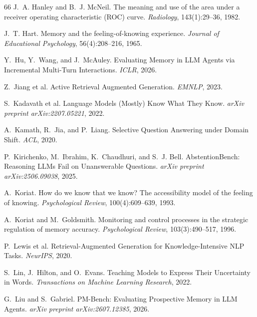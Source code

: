 \documentclass{article}
\begin{document}
\begin{thebibliography}{66}
J.~A. Hanley and B.~J. McNeil. The meaning and use of the area under a receiver operating characteristic (ROC) curve. \emph{Radiology}, 143(1):29--36, 1982.

J.~T. Hart. Memory and the feeling-of-knowing experience. \emph{Journal of Educational Psychology}, 56(4):208--216, 1965.

Y.~Hu, Y.~Wang, and J.~McAuley. Evaluating Memory in LLM Agents via Incremental Multi-Turn Interactions. \emph{ICLR}, 2026.

Z.~Jiang et al. Active Retrieval Augmented Generation. \emph{EMNLP}, 2023.

S.~Kadavath et al. Language Models (Mostly) Know What They Know. \emph{arXiv preprint arXiv:2207.05221}, 2022.

A.~Kamath, R.~Jia, and P.~Liang. Selective Question Answering under Domain Shift. \emph{ACL}, 2020.

P.~Kirichenko, M.~Ibrahim, K.~Chaudhuri, and S.~J. Bell. AbstentionBench: Reasoning LLMs Fail on Unanswerable Questions. \emph{arXiv preprint arXiv:2506.09038}, 2025.

A.~Koriat. How do we know that we know? The accessibility model of the feeling of knowing. \emph{Psychological Review}, 100(4):609--639, 1993.

A.~Koriat and M.~Goldsmith. Monitoring and control processes in the strategic regulation of memory accuracy. \emph{Psychological Review}, 103(3):490--517, 1996.

P.~Lewis et al. Retrieval-Augmented Generation for Knowledge-Intensive NLP Tasks. \emph{NeurIPS}, 2020.

S.~Lin, J.~Hilton, and O.~Evans. Teaching Models to Express Their Uncertainty in Words. \emph{Transactions on Machine Learning Research}, 2022.

G.~Liu and S.~Gabriel. PM-Bench: Evaluating Prospective Memory in LLM Agents. \emph{arXiv preprint arXiv:2607.12385}, 2026.


\end{thebibliography}
\end{document}
